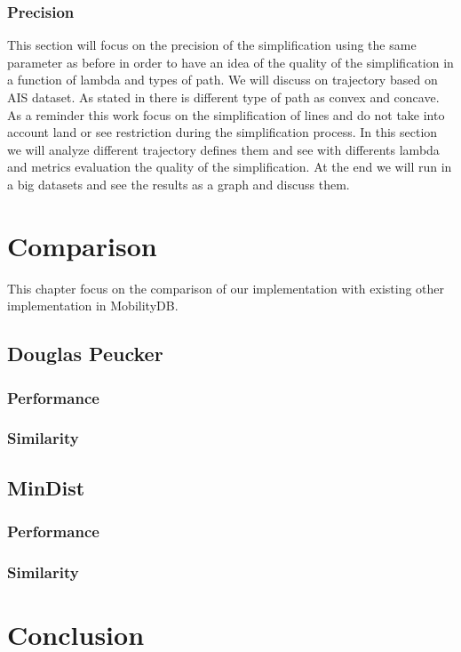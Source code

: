 \documentclass[twoside,12pt, a4paper]{report}
\begin{document}
\subsection{Precision}
This section will focus on the precision of the simplification using the same parameter as before in order to have an idea of the quality of the simplification in a function of lambda and types of path. We will discuss on trajectory based on AIS dataset. As stated in \cite{abam2007streaming} there is different type of path as convex and concave. As a reminder this work focus on the simplification of lines and do not take into account land or see restriction during the simplification process. In this section we will analyze different trajectory defines them and see with differents lambda and metrics evaluation the quality of the simplification. At the end we will run in a big datasets and see the results as a graph and discuss them. 

\subsubsection{} 


\chapter{Comparison}
This chapter focus on the comparison of our implementation with existing other implementation in MobilityDB.

\section{Douglas Peucker}
\subsection{Performance}
\subsection{Similarity}

\section{MinDist}
\subsection{Performance}
\subsection{Similarity}

\chapter{Conclusion}

\newpage
\printbibliography
%
%
\end{document}
